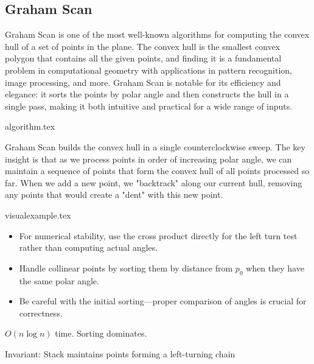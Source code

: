 \subsection{Graham Scan}
\label{ssec:graham_scan}

Graham Scan is one of the most well-known algorithms for computing the convex hull of a set of points in the plane. The convex hull is the smallest convex polygon that contains all the given points, and finding it is a fundamental problem in computational geometry with applications in pattern recognition, image processing, and more. Graham Scan is notable for its efficiency and elegance: it sorts the points by polar angle and then constructs the hull in a single pass, making it both intuitive and practical for a wide range of inputs.

{algorithm.tex}
\label{algorithm:graham_scan_algorithm}

\begin{intuition}
Graham Scan builds the convex hull in a single counterclockwise sweep. The key insight is that as we process points in order of increasing polar angle, we can maintain a sequence of points that form the convex hull of all points processed so far. When we add a new point, we "backtrack" along our current hull, removing any points that would create a "dent" with this new point.
\end{intuition}

{visualexample.tex}
\label{visualexample:graham_scan_visualexample}

\begin{tipsbox}
\begin{itemize}
    \item For numerical stability, use the cross product directly for the left turn test rather than computing actual angles.
    \item Handle collinear points by sorting them by distance from $p_0$ when they have the same polar angle.
    \item Be careful with the initial sorting—proper comparison of angles is crucial for correctness.
\end{itemize}
\end{tipsbox}


\begin{complexity}
\label{comp:graham_scan}
$O(n \log n)$ time. Sorting dominates.
\end{complexity}
Invariant: Stack maintains points forming a left-turning chain